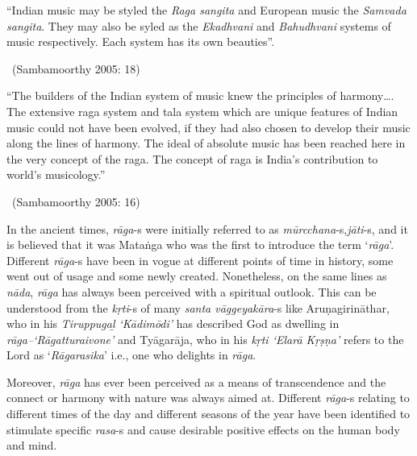 \begin{myquote}
“Indian music may be styled the \textit{Raga sangita} and European music the \textit{Samvada sangita}. They may also be syled as the \textit{Ekadhvani} and \textit{Bahudhvani} systems of music respectively. Each system has its own beauties”. 

~\hfill (Sambamoorthy 2005: 18)
\end{myquote}

\begin{myquote}
“The builders of the Indian system of music knew the principles of harmony…. The extensive raga system and tala system which are unique features of Indian music could not have been evolved, if they had also chosen to develop their music along the lines of harmony. The ideal of absolute music has been reached here in the very concept of the raga. The concept of raga is India’s contribution to world’s musicology.” 

~\hfill (Sambamoorthy 2005: 16)
\end{myquote}

In the ancient times, \textit{rāga}-s were initially referred to as \textit{mūrcchana}-s,\break \textit{jāti}-s, and it is believed that it was Mataṅga who was the first to introduce the term ‘\textit{rāga}’. Different \textit{rāga}-s have been in vogue at different points of time in history, some went out of usage and some newly created. Nonetheless, on the same lines as \textit{nāda}, \textit{rāga} has always been perceived with a spiritual outlook. This can be understood from the \textit{kṛti}-s of many \textit{santa vāggeyakāra}-s like Aruṇagirināthar, who in his \textit{Tiruppugaḻ ‘Kādimōdi’} has described God as dwelling in \textit{rāga–‘Rāgatturaivone’} and Tyāgarāja, who in his \textit{kṛti ‘Elarā Kṛṣṇa’} refers to the Lord as ‘\textit{Rāgarasika}’ i.e., one who delights in \textit{rāga}.

Moreover, \textit{rāga} has ever been perceived as a means of transcendence and the connect or harmony with nature was always aimed at. Different \textit{rāga}-s relating to different times of the day and different seasons of the year have been identified to stimulate specific \textit{rasa}-s and cause desirable positive effects on the human body and mind.


